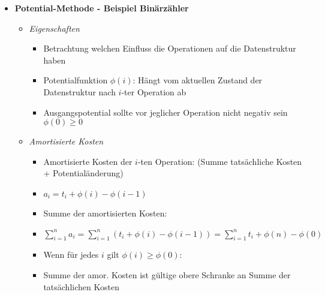 \begin{itemize}
\pagebreak

        \item \textbf{Potential-Methode - Beispiel Binärzähler}
            \begin{itemize}
                \item \textit{Eigenschaften}
                    \begin{itemize}
                        \item Betrachtung welchen Einfluss die Operationen auf die Datenstruktur haben
                        \item Potentialfunktion $\phi(i)$: Hängt vom aktuellen Zustand der Datenstruktur nach $i$-ter Operation ab
                        \item Ausgangspotential sollte vor jeglicher Operation nicht negativ sein $\phi(0) \geq 0$
                    \end{itemize}

                \item \textit{Amortisierte Kosten}
                    \begin{itemize}
                        \item Amortisierte Kosten der $i$-ten Operation: (Summe tatsächliche Kosten + Potentialänderung)
                        \item[] $a_i = t_i + \phi(i) - \phi(i-1)$
                        \item Summe der amortisierten Kosten:
                        \item[] $\sum^n_{i=1} a_i = \sum^n_{i=1} (t_i + \phi(i) - \phi(i - 1)) = \sum^n_{i=1} t_i + \phi(n) - \phi(0)$
                        \item Wenn für jedes $i$ gilt $\phi(i) \geq \phi(0)$:
                        \item[] Summe der amor. Kosten ist gültige obere Schranke an Summe der tatsächlichen Kosten 
                    \end{itemize}


\end{itemize}
\end{itemize}
